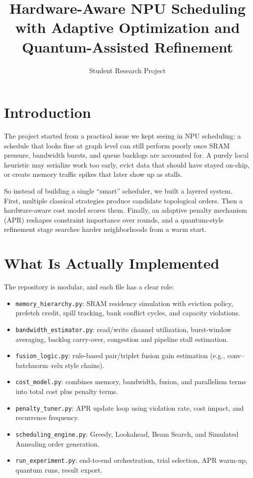 \documentclass[11pt]{article}
\title{Hardware-Aware NPU Scheduling with Adaptive Optimization and Quantum-Assisted Refinement}
\author{Student Research Project}
\date{}
\begin{document}
\maketitle

\section{Introduction}
The project started from a practical issue we kept seeing in NPU scheduling: a schedule that looks fine at graph level can still perform poorly once SRAM pressure, bandwidth bursts, and queue backlogs are accounted for. A purely local heuristic may serialize work too early, evict data that should have stayed on-chip, or create memory traffic spikes that later show up as stalls.

So instead of building a single ``smart'' scheduler, we built a layered system. First, multiple classical strategies produce candidate topological orders. Then a hardware-aware cost model scores them. Finally, an adaptive penalty mechanism (APR) reshapes constraint importance over rounds, and a quantum-style refinement stage searches harder neighborhoods from a warm start.

\section{What Is Actually Implemented}
The repository is modular, and each file has a clear role:
\begin{itemize}
    \item \texttt{memory\_hierarchy.py}: SRAM residency simulation with eviction policy, prefetch credit, spill tracking, bank conflict cycles, and capacity violations.
    \item \texttt{bandwidth\_estimator.py}: read/write channel utilization, burst-window averaging, backlog carry-over, congestion and pipeline stall estimation.
    \item \texttt{fusion\_logic.py}: rule-based pair/triplet fusion gain estimation (e.g., conv--batchnorm--relu style chains).
    \item \texttt{cost\_model.py}: combines memory, bandwidth, fusion, and parallelism terms into total cost plus penalty terms.
    \item \texttt{penalty\_tuner.py}: APR update loop using violation rate, cost impact, and recurrence frequency.
    \item \texttt{scheduling\_engine.py}: Greedy, Lookahead, Beam Search, and Simulated Annealing order generation.
    \item \texttt{run\_experiment.py}: end-to-end orchestration, trial selection, APR warm-up, quantum runs, result export.
\end{itemize}
\end{document}
